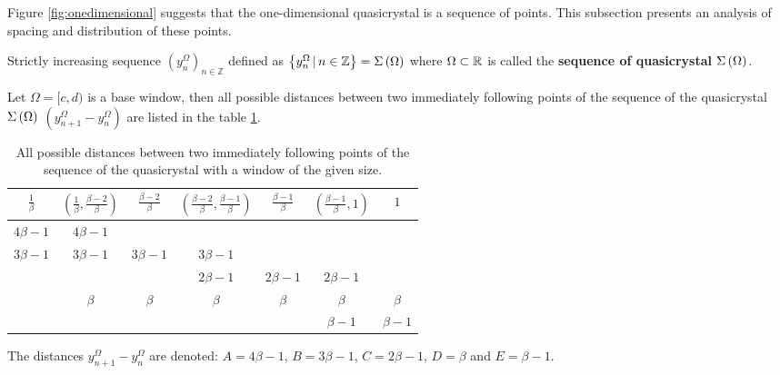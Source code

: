 \documentclass[text.tex]{subfiles}
\begin{document}
Figure \ref{fig:onedimensional} suggests that the one-dimensional quasicrystal is a sequence of points. This subsection presents an analysis of spacing and distribution of these points.

\begin{definition}
Strictly increasing sequence $(y_n^\Omega)_{n\in \mathbb{Z}}$ defined as $\left\{y_n^\Omega\,|\, n\in\mathbb{Z} \right\} = \Sigma\left(\Omega\right)$ where $\Omega \subset \mathbb{R}$ is called the \textbf{sequence of quasicrystal $\Sigma\left(\Omega\right)$}.
\end{definition}

\begin{theorem}
\label{the:spaces:sum}
Let $\Omega = [c,d)$ is a base window, then all possible distances between two immediately following points of the sequence of  the quasicrystal $\Sigma\left(\Omega\right)$ $\left(y_{n+1}^\Omega-y_n^\Omega\right)$ are listed in the table \ref{table:spaces}.
\begin{table}[h]
\begin{center}
\begin{tabular}{ccccccc}
	\toprule
		$\frac{1}{\beta}$	&	$\left( \frac{1}{\beta}, \frac{\beta - 2}{\beta} \right)$	&	$\frac{\beta-2}{\beta}$	&	$\left( \frac{\beta-2}{\beta}, \frac{\beta-1}{\beta} \right)$	&	$\frac{\beta-1}{\beta}$	&	$\left( \frac{\beta-1}{\beta}, 1 \right)$	&	$1$\\
	\midrule
		$4\beta-1$ 	&	$4\beta-1$	&				&				&				&				&			 	\\ 
		$3\beta-1$	&	$3\beta-1$	&	$3\beta-1$	&	$3\beta-1$	&				&				&			 	\\
					&				&				&	$2\beta-1$	&	$2\beta-1$	&	$2\beta-1$	&				\\
					&	$\beta$		&	$\beta$		&	$\beta$		&	$\beta$		&	$\beta$		&	$\beta$		\\
					&				&				&				&				&	$\beta-1$	&	$\beta-1$	\\
	\bottomrule
\end{tabular}
\caption{All possible distances between two immediately following points of the sequence of the quasicrystal with a window of the given size.}
\label{table:spaces}
\end{center}
\end{table}
%
\end{theorem}

\begin{definition}
\label{def:distancesNotation}
The distances $y_{n+1}^\Omega-y_n^\Omega$ are denoted: $A = 4\beta-1$, $B = 3\beta-1$, $C = 2\beta-1$, $D = \beta$ and $E = \beta-1$.
\end{definition}
\end{document}
